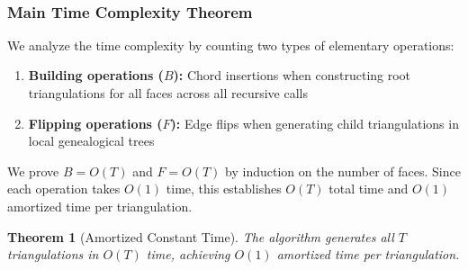 ﻿﻿\documentclass[12pt,a4paper]{article}
\newtheorem{theorem}{Theorem}
\theoremstyle{definition}
\theoremstyle{remark}
\begin{document}
\subsubsection{Main Time Complexity Theorem}

We analyze the time complexity by counting two types of elementary operations:
\begin{enumerate}
	\item \textbf{Building operations ($B$):} Chord insertions when constructing root triangulations for all faces across all recursive calls
	\item \textbf{Flipping operations ($F$):} Edge flips when generating child triangulations in local genealogical trees
\end{enumerate}

We prove $B = O(T)$ and $F = O(T)$ by induction on the number of faces. Since each operation takes $O(1)$ time, this establishes $O(T)$ total time and $O(1)$ amortized time per triangulation.

\begin{theorem}[Amortized Constant Time]
	\label{thm:time_complexity}
	The algorithm generates all $T$ triangulations in $O(T)$ time, achieving $O(1)$ amortized time per triangulation.
\end{theorem}
\end{document}
